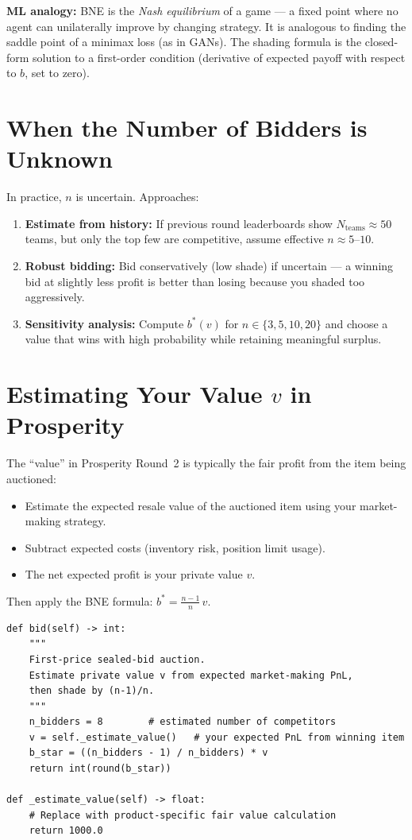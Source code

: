 \documentclass[12pt,a4paper,openany]{report}
\theoremstyle{definition}
\begin{document}
\textbf{ML analogy:} BNE is the \emph{Nash equilibrium} of a game — a fixed point where no agent can unilaterally improve by changing strategy. It is analogous to finding the saddle point of a minimax loss (as in GANs). The shading formula is the closed-form solution to a first-order condition (derivative of expected payoff with respect to $b$, set to zero).

\section{When the Number of Bidders is Unknown}

In practice, $n$ is uncertain. Approaches:
\begin{enumerate}[label=\arabic*.]
  \item \textbf{Estimate from history:} If previous round leaderboards show $N_{\text{teams}} \approx 50$ teams, but only the top few are competitive, assume effective $n \approx 5$--$10$.
  \item \textbf{Robust bidding:} Bid conservatively (low shade) if uncertain — a winning bid at slightly less profit is better than losing because you shaded too aggressively.
  \item \textbf{Sensitivity analysis:} Compute $b^*(v)$ for $n \in \{3, 5, 10, 20\}$ and choose a value that wins with high probability while retaining meaningful surplus.
\end{enumerate}

\section{Estimating Your Value $v$ in Prosperity}

The ``value'' in Prosperity Round~2 is typically the fair profit from the item being auctioned:
\begin{itemize}
  \item Estimate the expected resale value of the auctioned item using your market-making strategy.
  \item Subtract expected costs (inventory risk, position limit usage).
  \item The net expected profit is your private value $v$.
\end{itemize}
Then apply the BNE formula: $b^* = \frac{n-1}{n}\,v$.

\begin{lstlisting}
def bid(self) -> int:
    """
    First-price sealed-bid auction.
    Estimate private value v from expected market-making PnL,
    then shade by (n-1)/n.
    """
    n_bidders = 8        # estimated number of competitors
    v = self._estimate_value()   # your expected PnL from winning item
    b_star = ((n_bidders - 1) / n_bidders) * v
    return int(round(b_star))

def _estimate_value(self) -> float:
    # Replace with product-specific fair value calculation
    return 1000.0
\end{lstlisting}
\end{document}
